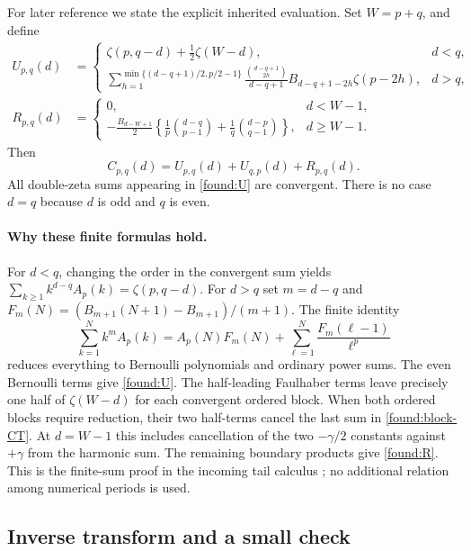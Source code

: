 For later reference we state the explicit inherited evaluation.
Set $W=p+q$, and define
\begin{align}
 U_{p,q}(d)&=
 \begin{cases}
 \zeta(p,q-d)+\tfrac12\zeta(W-d),&d<q,\\[3pt]
 \displaystyle\sum_{h=1}^{\min\{(d-q+1)/2,p/2-1\}}
 \frac{\binom{d-q+1}{2h}}{d-q+1}
 B_{d-q+1-2h}\zeta(p-2h),&d>q,
 \end{cases}\label{found:U}\\
 R_{p,q}(d)&=
 \begin{cases}
 0,&d<W-1,\\[3pt]
 \displaystyle-\frac{B_{d-W+1}}2
 \left\{\frac1p\binom{d-q}{p-1}
       +\frac1q\binom{d-p}{q-1}\right\},&d\ge W-1.
 \end{cases}\label{found:R}
\end{align}
Then
\begin{equation}\label{found:C-evaluation}
 C_{p,q}(d)=U_{p,q}(d)+U_{q,p}(d)+R_{p,q}(d).
\end{equation}
All double-zeta sums appearing in \eqref{found:U} are convergent.
There is no case $d=q$ because $d$ is odd and $q$ is even.

\paragraph{Why these finite formulas hold.}
For $d<q$, changing the order in the convergent sum yields
$\sum_{k\ge1}k^{d-q}A_p(k)=\zeta(p,q-d)$.
For $d>q$ set $m=d-q$ and
$F_m(N)=(B_{m+1}(N+1)-B_{m+1})/(m+1)$. The finite identity
\[
 \sum_{k=1}^N k^mA_p(k)
 =A_p(N)F_m(N)+
                  \sum_{\ell=1}^N\frac{F_m(\ell-1)}{\ell^p}
\]
reduces everything to Bernoulli polynomials and ordinary power sums.
The even Bernoulli terms give \eqref{found:U}. The half-leading Faulhaber terms leave precisely
one half of $\zeta(W-d)$ for each convergent ordered block. When
both ordered blocks require reduction, their two half-terms cancel
the last sum in \eqref{found:block-CT}. At $d=W-1$ this includes cancellation of
the two $-\gamma/2$ constants against $+\gamma$ from the harmonic
sum. The remaining boundary products give \eqref{found:R}.
This is the finite-sum proof in the incoming tail calculus
\cite{Canonical,Bernoulli}; no additional relation among numerical
periods is used.

\subsection{Inverse transform and a small check}

